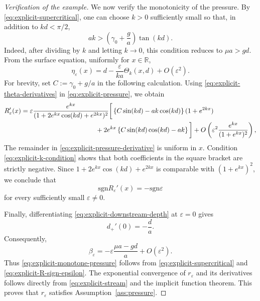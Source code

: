 \documentclass[12pt,letterpaper]{amsart}
\numberwithin{equation}{section}
\def\R{{\mathbb R}}
\def\sgn{\mathrm{sgn}}
\begin{document}
\begin{proof}[{Verification of the example}]
		We now verify the monotonicity of the pressure.  By
		\eqref{eq:explicit-supercritical}, one can choose $k>0$ sufficiently
		small so that, in addition to $kd<\pi/2$,
		\begin{equation}\label{eq:explicit-k-condition}
			ak>\left(\gamma_0+\frac{g}{a}\right)\tan(kd).
		\end{equation}
		Indeed, after dividing by $k$ and letting $k\to0$, this condition
		reduces to $\mu a>gd$.  From the surface equation, uniformly for
		$x\in\R$,
		\begin{equation*}
			\eta_\varepsilon(x)
			=d-\frac{\varepsilon}{ka}\Theta_k(x,d)
			+O(\varepsilon^2).
		\end{equation*}
		{For brevity, set $C:=\gamma_0+g/a$ in the following calculation. Using \eqref{eq:explicit-theta-derivatives} in \eqref{eq:explicit-pressure}, we obtain}
		\begin{equation}\label{eq:explicit-pressure-derivative}
			\begin{aligned}
				R_\varepsilon'(x)
				={}&\varepsilon\frac{e^{kx}}{{(1+2e^{kx}\cos(kd)+e^{2kx})^2}}
				\bigg[\left\{C\sin(kd)-ak\cos(kd)\right\}(1+e^{2kx})\\
				&\hspace{35mm}
				+2e^{kx}\left\{C\sin(kd)\cos(kd)-ak\right\}\bigg]
				+O\left(\varepsilon^2\frac{e^{kx}}{(1+e^{kx})^2}\right),
			\end{aligned}
		\end{equation}
		{The remainder} in \eqref{eq:explicit-pressure-derivative} is uniform
		in $x$.  Condition \eqref{eq:explicit-k-condition} shows that both
		coefficients in the square bracket are strictly negative.  Since
		$1+2e^{kx}\cos(kd)+e^{2kx}$ is comparable with $(1+e^{kx})^2$, we conclude that
		\begin{equation}\label{eq:explicit-R-sign-epsilon}
			\sgn R_\varepsilon'(x)=-\sgn\varepsilon
		\end{equation}
		for every sufficiently small $\varepsilon\ne0$.
		
		Finally, differentiating \eqref{eq:explicit-downstream-depth} at
		$\varepsilon=0$ gives
		\begin{equation*}
			d_+'(0)=-\frac{d}{a}.
		\end{equation*}
		Consequently,
		\begin{equation*}
			\beta_\varepsilon
			=-\varepsilon\frac{\mu a-gd}{a}+O(\varepsilon^2).
		\end{equation*}
		Thus \eqref{eq:explicit-monotone-pressure} follows from
		\eqref{eq:explicit-supercritical} and
		\eqref{eq:explicit-R-sign-epsilon}.  The exponential convergence of
		$r_\varepsilon$ and its derivatives follows directly from
	 \eqref{eq:explicit-stream} and the implicit function
		theorem.  This proves that $r_\varepsilon$ satisfies
		Assumption~\ref{ass:pressure}.
\end{proof}
\end{document}
